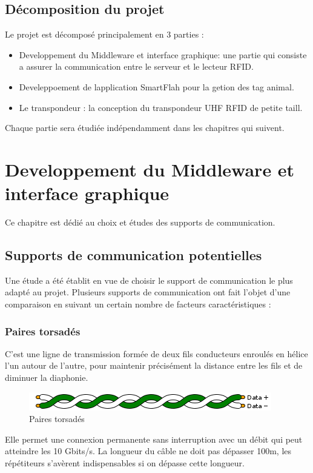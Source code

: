 \documentclass[11pt, a4paper, twoside]{book}
\begin{document}
\section{Décomposition du projet}
Le projet est décomposé principalement en 3 parties :
\begin{itemize}
\item Developpement du Middleware et interface graphique: une partie qui consiste a assurer la communication entre le serveur et le lecteur RFID.
\item Develeppoement de lapplication SmartFlah pour la getion des tag animal.
\item Le transpondeur : la conception du transpondeur UHF RFID de petite taill.\\
\end{itemize}

Chaque partie sera étudiée indépendamment dans les chapitres qui suivent.

\chapter{Developpement du Middleware et interface graphique}
Ce chapitre est dédié au choix et études des supports de communication.
\section{Supports de communication potentielles}
Une étude a été établit en vue de choisir le support de communication le plus adapté au projet. Plusieurs supports de communication ont fait l’objet d’une comparaison en suivant un certain nombre de facteurs caractéristiques :
\subsection{Paires torsadés}
C’est une ligne de transmission formée de deux fils conducteurs enroulés en hélice l’un autour de l’autre, pour maintenir précisément la distance entre les fils et de diminuer la diaphonie.
\begin{figure}[h!]
\centering
\includegraphics[width=\textwidth]{twistedPair}
\caption{Paires torsadés}
\end{figure}
Elle permet une connexion permanente sans interruption avec un débit qui peut atteindre les 10 Gbits/s. La longueur du câble ne doit pas dépasser 100m, les répétiteurs s'avèrent indispensables si on dépasse cette longueur.
\end{document}
